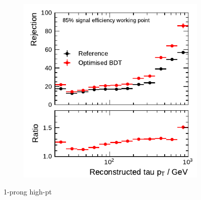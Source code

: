 \begin{figure}[htb]
\begin{subfigure}{0.48\textwidth}
  \end{subfigure}
  \begin{subfigure}{0.48\textwidth}
    \centering
    \includegraphics{./figures/bdt_perf/post_optimisation/1p_highpt/rejection_loose_ratio_highpt.pdf}
  \end{subfigure}
  \caption{1-prong high-pt}
\end{figure}

